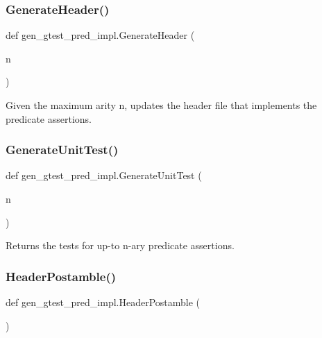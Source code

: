 \subsubsection{\texorpdfstring{GenerateHeader()}{GenerateHeader()}}
{\footnotesize\ttfamily def gen\+\_\+gtest\+\_\+pred\+\_\+impl.\+Generate\+Header (\begin{DoxyParamCaption}\item[{}]{n }\end{DoxyParamCaption})}

\begin{DoxyVerb}Given the maximum arity n, updates the header file that implements
the predicate assertions.
\end{DoxyVerb}
 \mbox{\label{namespacegen__gtest__pred__impl_acbd42b5b7fb7ddbb06a4dd58fc37e9ed}} 
\subsubsection{\texorpdfstring{GenerateUnitTest()}{GenerateUnitTest()}}
{\footnotesize\ttfamily def gen\+\_\+gtest\+\_\+pred\+\_\+impl.\+Generate\+Unit\+Test (\begin{DoxyParamCaption}\item[{}]{n }\end{DoxyParamCaption})}

\begin{DoxyVerb}Returns the tests for up-to n-ary predicate assertions.\end{DoxyVerb}
 \mbox{\label{namespacegen__gtest__pred__impl_a3d40c7ef70cf4d46e56c9612f34027bf}} 
\subsubsection{\texorpdfstring{HeaderPostamble()}{HeaderPostamble()}}
{\footnotesize\ttfamily def gen\+\_\+gtest\+\_\+pred\+\_\+impl.\+Header\+Postamble (\begin{DoxyParamCaption}{ }\end{DoxyParamCaption})}

